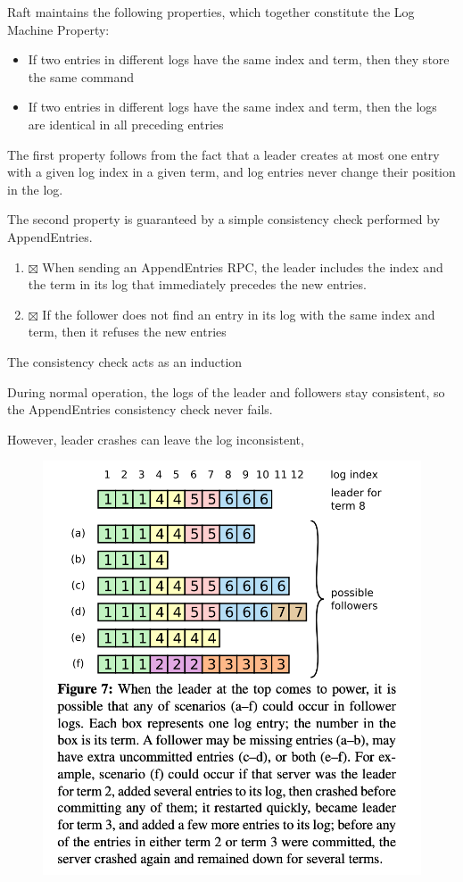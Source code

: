 \documentclass[11pt]{article}
\begin{document}
Raft maintains the following properties, which together constitute the Log Machine Property:
\begin{itemize}
\item If two entries in different logs have the same index and term, then they store the same command
\item If two entries in different logs have the same index and term, then the logs are identical in
all preceding entries
\end{itemize}

The first property follows from the fact that a leader creates at most one entry with a given
log index in a given term, and log entries never change their position in the log.

The second property is guaranteed by a simple consistency check performed by AppendEntries.
\begin{enumerate}
\item{$\boxtimes$} When sending an AppendEntries RPC, the leader includes the index and the term in its log that
immediately precedes the new entries.
\item{$\boxtimes$} If the follower does not find an entry in its log with the same index and term, then it
refuses the new entries
\end{enumerate}
The consistency check acts as an induction

During normal operation, the logs of the leader and followers stay consistent, so the
AppendEntries consistency check never fails.

However, leader crashes can leave the log inconsistent,
\begin{figure}[htbp]
\centering
\includegraphics[width=.7\textwidth]{../images/6.824/7.png}
\label{}
\end{figure}
\end{document}
